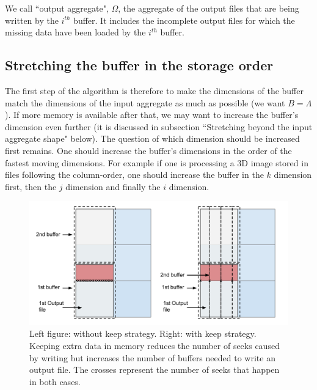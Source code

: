 \documentclass[conference]{IEEEtran}
\begin{document}
We call ``output aggregate", $\Omega$, the aggregate of the output files that are being written by the $i^{th}$ buffer. It includes the incomplete output files for which the missing data have been loaded by the $i^{th}$ buffer. \\

\subsection{Stretching the buffer in the storage order}
The first step of the algorithm is therefore to make the dimensions of the buffer match the dimensions of the input aggregate as much as possible (we want $B=\Lambda$).
If more memory is available after that, we may want to increase the buffer's dimension even further (it is discussed in subsection ``Stretching beyond the input aggregate shape" below).
The question of which dimension should be increased first remains.
One should increase the buffer's dimensions in the order of the fastest moving dimensions.
For example if one is processing a 3D image stored in files following the column-order, one should increase the buffer in the $k$ dimension first, then the $j$ dimension and finally the $i$ dimension. \\

\begin{figure}[h]
\centering
\includegraphics[scale=0.20]{./figures/case_1_2.png}
\caption{Left figure: without keep strategy.
Right: with keep strategy.
Keeping extra data in memory reduces the number of seeks caused by writing but increases the number of buffers needed to write an output file.
The crosses represent the number of seeks that happen in both cases.
}
\label{fig:case_1_2}
\end{figure}
\end{document}
